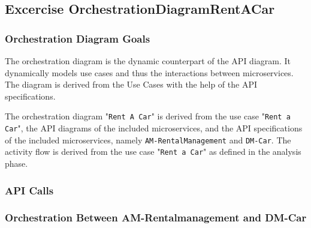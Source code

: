 \subsection{Excercise OrchestrationDiagramRentACar}
\subsubsection*{Orchestration Diagram Goals}
The orchestration diagram is the dynamic counterpart of the API diagram.
It dynamically models use cases and thus the interactions between microservices.
The diagram is derived from the Use Cases with the help of the API specifications.

The orchestration diagram "\texttt{Rent A Car}" is derived from the use case "\texttt{Rent a Car}", the API diagrams of the included microservices, and the API specifications of the included microservices, namely \texttt{AM-RentalManagement} and \texttt{DM-Car}.
The activity flow is derived from the use case "\texttt{Rent a Car}" as defined in the analysis phase.

\subsubsection*{API Calls}



\subsubsection*{Orchestration Between AM-Rentalmanagement and DM-Car}



